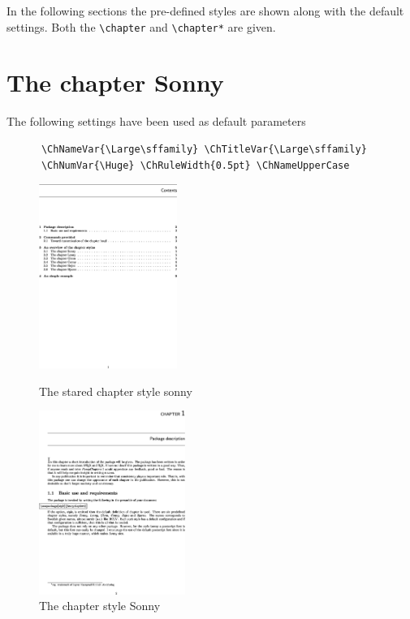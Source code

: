 \documentclass{report}
\newcommand{\A}[1]{{\texttt{\textbackslash #1}}}
\begin{document}
    In the following sections the pre-defined styles are shown along
    with the default settings. Both the \A{chapter} and \A{chapter*}
    are given.

    \section{The chapter Sonny}
    The following settings have been used as default parameters
    {\small\begin{verbatim}  
      \ChNameVar{\Large\sffamily} \ChTitleVar{\Large\sffamily}
      \ChNumVar{\Huge} \ChRuleWidth{0.5pt} \ChNameUpperCase
    \end{verbatim}}    
    \begin{figure}[h]
      \begin{minipage}{7 cm}
        \label{fig:Sonnys}
        \centerline{\includegraphics[height=6cm]{Sonnys.eps}} 
        \caption{The stared chapter style sonny}
      \end{minipage}\hfill
      \begin{minipage}{7 cm}
        \label{fig:Sonny}
        \centerline{\includegraphics[height=6cm]{Sonny.eps}}
        \caption{The chapter style Sonny}
      \end{minipage}\hfill
    \end{figure}    
    
\end{document}
